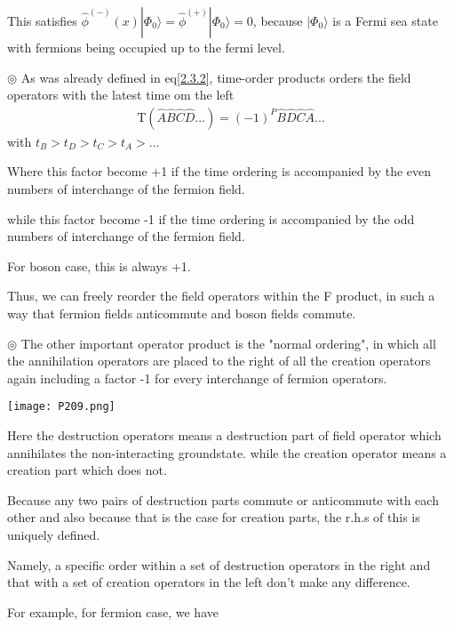 This satisfies $\hat \phi^{(-)}(x)|\Phi_0\rangle=\hat \phi ^{(+)}|\Phi_0\rangle=0$, because $|\Phi_0\rangle$ is a Fermi sea state with fermions being occupied up to the fermi level.

$\circledcirc$ As was already defined in eq\ref{2.3.2}, time-order products orders the field operators with the latest time om the left
\begin{align}
\mathrm{T}(\hat{A}\hat{B}\hat{C}\hat{D}...)=(-1)^P\hat{B}\hat{D}\hat{C}\hat{A}... \nonumber
\end{align}
with $t_B>t_D>t_C>t_A>...$

Where this factor become +1 if the time ordering is accompanied by the even numbers of interchange of the fermion field.

while this factor become -1 if the time ordering is accompanied by the odd numbers of interchange of the fermion field.

For boson case, this is always +1.

Thus, we can freely reorder the field operators within the F product, in such a way that fermion fields anticommute and boson fields commute.

$\circledcirc$ The other important operator product is the "normal ordering", in which all the annihilation operators are placed to the right of all the creation operators again including a factor -1 for every interchange of fermion operators.
 \begin{center}
\texttt{[image: P209.png]}
\end{center}
Here the destruction operators means a destruction part of field operator which annihilates the non-interacting groundstate. while the creation operator means a creation part which does not.

Because any two pairs of destruction parts commute or anticommute with each other and also because that is the case for creation parts, the r.h.s of this is uniquely defined.

Namely, a specific order within a set of destruction operators in the right and that with a set of creation operators in the left don't make any difference.

For example, for fermion case, we have 

